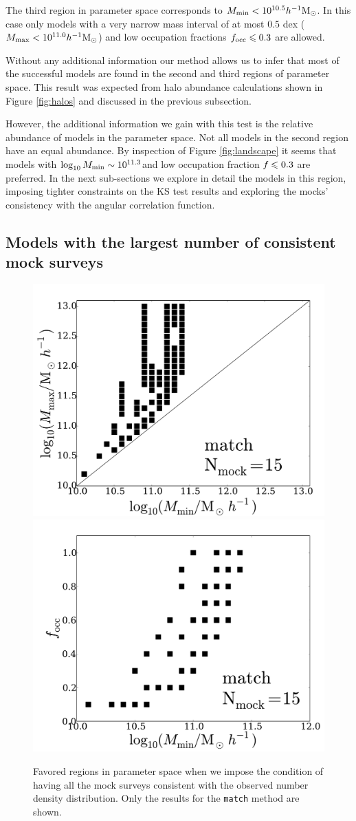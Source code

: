 \documentclass[usenatbib]{mn2e}
\newcommand{\hMsun}{{\ifmmode{h^{-1}{\rm
        {M_{\odot}}}}\else{$h^{-1}{\rm{M_{\odot}}}$}\fi}}
\begin{document}
The third region in parameter space corresponds to $M_{\rm
  min}<10^{10.5}\hMsun$. In this case only models with a very narrow
mass interval of at most $0.5$ dex ($M_{\rm max}<10^{11.0}\hMsun$) and low
occupation fractions $f_{\rm occ}\leq 0.3$ are allowed. 

Without any additional information our method allows us to infer that
most of the successful models are found in the second and third regions of
parameter space. This result was expected from halo
abundance calculations shown in Figure \ref{fig:halos} and discussed
in the previous subsection. 

However, the additional information we gain with this test is the
relative abundance of models in the parameter space. Not all 
models in the second region have an equal abundance. By inspection of
Figure \ref{fig:landscape} it seems that models with $\log_{10}M_{\rm
  min}\sim 10^{11.3}$\hMsun and low occupation fraction $f_{\rm}\leq 0.3$
are preferred.  In the next sub-sections we explore in detail the
models in this region, imposing tighter constraints on the KS test
results and exploring the mocks' consistency with the angular correlation
function.  

 
\subsection{Models with the largest number of consistent mock surveys}


\begin{figure}
\begin{center}
\includegraphics[width=0.46\linewidth,angle=0]{Fig5_match_mass_mock.pdf} 
\hspace{5mm}
\includegraphics[width=0.46\linewidth,angle=0]{Fig5_match_f_occ_mock.pdf}
\end{center}  
\caption{Favored regions in parameter space when we impose the
  condition of having all the mock surveys consistent with the
  observed number density distribution. Only the results for the
  {\texttt{match}} method are shown. \label{fig:restriction_mock}}  
\end{figure}
\end{document}
